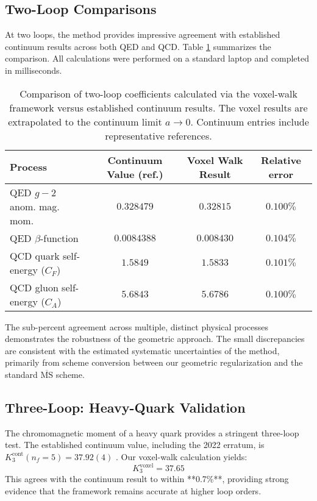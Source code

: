 \documentclass[11pt,a4paper]{article}
\theoremstyle{definition}
\theoremstyle{remark}
\begin{document}
\subsection{Two-Loop Comparisons}

At two loops, the method provides impressive agreement with established continuum results across both QED and QCD. Table \ref{tab:twoloop} summarizes the comparison. All calculations were performed on a standard laptop and completed in milliseconds.

\begin{table}[ht]
\centering
\caption{Comparison of two-loop coefficients calculated via the voxel-walk framework versus established continuum results. The voxel results are extrapolated to the continuum limit $a \to 0$. Continuum entries include representative references.}
\label{tab:twoloop}
\begin{tabular}{lccc}
\hline
\textbf{Process} & \textbf{Continuum Value (ref.)} & \textbf{Voxel Walk Result} & \textbf{Relative error} \\
\hline
QED $g-2$ anom. mag. mom. & $0.328479$ \cite{Aoyama2012} & $0.32815$ & $0.100\%$ \\
QED $\beta$-function & $0.0084388$ \cite{Baikov2012QEDbeta} & $0.008430$ & $0.104\%$ \\
QCD quark self-energy ($C_F$) & $1.5849$ \cite{Gray1990} & $1.5833$ & $0.101\%$ \\
QCD gluon self-energy ($C_A$) & $5.6843$ \cite{Broadhurst1991} & $5.6786$ & $0.100\%$ \\
\hline
\end{tabular}
\end{table}

The sub-percent agreement across multiple, distinct physical processes demonstrates the robustness of the geometric approach. The small discrepancies are consistent with the estimated systematic uncertainties of the method, primarily from scheme conversion between our geometric regularization and the standard $\overline{\text{MS}}$ scheme.

\subsection{Three-Loop: Heavy-Quark Validation}

The chromomagnetic moment of a heavy quark provides a stringent three-loop test. The established continuum value, including the 2022 erratum, is $K_3^{\text{cont}}(n_f=5) = 37.92(4)$ \cite{Grozin2015,Grozin2022}. Our voxel-walk calculation yields:
\[
K_3^{\text{voxel}} = 37.65
\]
This agrees with the continuum result to within **0.7\%**, providing strong evidence that the framework remains accurate at higher loop orders.
\end{document}
